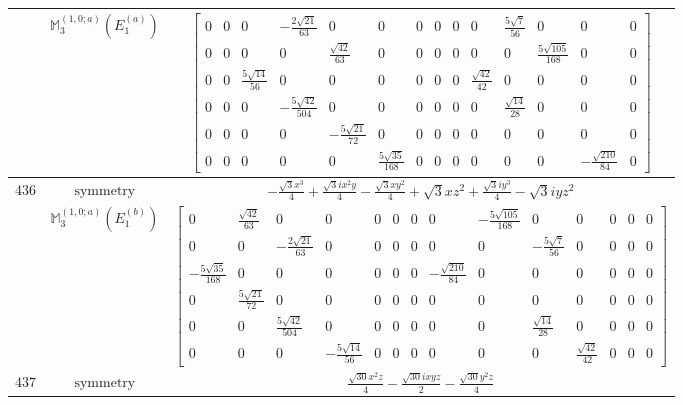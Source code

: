 \documentclass[fleqn,8pt,landscape]{jsarticle}
\begin{document}
\begin{longtable}{ccc}
$  $ & $ \mathbb{M}_{3}^{(1,0;a)}(E_{1}^{(a)}) $ & $ \begin{bmatrix} 0 & 0 & 0 & - \frac{2 \sqrt{21}}{63} & 0 & 0 & 0 & 0 & 0 & 0 & \frac{5 \sqrt{7}}{56} & 0 & 0 & 0 \\ 0 & 0 & 0 & 0 & \frac{\sqrt{42}}{63} & 0 & 0 & 0 & 0 & 0 & 0 & \frac{5 \sqrt{105}}{168} & 0 & 0 \\ 0 & 0 & \frac{5 \sqrt{14}}{56} & 0 & 0 & 0 & 0 & 0 & 0 & \frac{\sqrt{42}}{42} & 0 & 0 & 0 & 0 \\ 0 & 0 & 0 & - \frac{5 \sqrt{42}}{504} & 0 & 0 & 0 & 0 & 0 & 0 & \frac{\sqrt{14}}{28} & 0 & 0 & 0 \\ 0 & 0 & 0 & 0 & - \frac{5 \sqrt{21}}{72} & 0 & 0 & 0 & 0 & 0 & 0 & 0 & 0 & 0 \\ 0 & 0 & 0 & 0 & 0 & \frac{5 \sqrt{35}}{168} & 0 & 0 & 0 & 0 & 0 & 0 & - \frac{\sqrt{210}}{84} & 0 \end{bmatrix} $ \\ \hline
$ 436 $ & $ \text{symmetry} $ & $ - \frac{\sqrt{3} x^{3}}{4} + \frac{\sqrt{3} i x^{2} y}{4} - \frac{\sqrt{3} x y^{2}}{4} + \sqrt{3} x z^{2} + \frac{\sqrt{3} i y^{3}}{4} - \sqrt{3} i y z^{2} $ \\
$  $ & $ \mathbb{M}_{3}^{(1,0;a)}(E_{1}^{(b)}) $ & $ \begin{bmatrix} 0 & \frac{\sqrt{42}}{63} & 0 & 0 & 0 & 0 & 0 & 0 & - \frac{5 \sqrt{105}}{168} & 0 & 0 & 0 & 0 & 0 \\ 0 & 0 & - \frac{2 \sqrt{21}}{63} & 0 & 0 & 0 & 0 & 0 & 0 & - \frac{5 \sqrt{7}}{56} & 0 & 0 & 0 & 0 \\ - \frac{5 \sqrt{35}}{168} & 0 & 0 & 0 & 0 & 0 & 0 & - \frac{\sqrt{210}}{84} & 0 & 0 & 0 & 0 & 0 & 0 \\ 0 & \frac{5 \sqrt{21}}{72} & 0 & 0 & 0 & 0 & 0 & 0 & 0 & 0 & 0 & 0 & 0 & 0 \\ 0 & 0 & \frac{5 \sqrt{42}}{504} & 0 & 0 & 0 & 0 & 0 & 0 & \frac{\sqrt{14}}{28} & 0 & 0 & 0 & 0 \\ 0 & 0 & 0 & - \frac{5 \sqrt{14}}{56} & 0 & 0 & 0 & 0 & 0 & 0 & \frac{\sqrt{42}}{42} & 0 & 0 & 0 \end{bmatrix} $ \\ \hline
$ 437 $ & $ \text{symmetry} $ & $ \frac{\sqrt{30} x^{2} z}{4} - \frac{\sqrt{30} i x y z}{2} - \frac{\sqrt{30} y^{2} z}{4} $ \\

\end{longtable}
\end{document}
